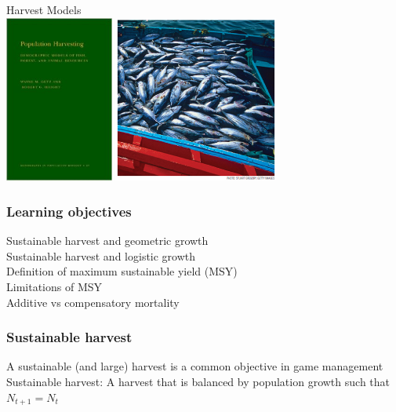 \documentclass[color=usenames,dvipsnames]{beamer}\usepackage[]{graphicx}\usepackage[]{xcolor}
\begin{document}
\begin{frame}[plain]
  \begin{center}
    {\huge Harvest Models} \\
    \vfill
    \includegraphics[height=5.5cm,keepaspectratio]{figs/book}
    \hspace{0.3cm}
    \includegraphics[height=5.5cm,keepaspectratio]{figs/tuna}
  \end{center}
\end{frame}


\begin{frame}
  \frametitle{Learning objectives}
  \large
  Sustainable harvest and geometric growth \\
  \vfill
  Sustainable harvest and logistic growth \\
  \vfill
  Definition of maximum sustainable yield (MSY) \\
  \vfill
  Limitations of MSY \\
  \vfill
  Additive vs compensatory mortality
\end{frame}





\begin{frame}
  \frametitle{Sustainable harvest}
  \large
  {%
    A sustainable (and large) harvest is a common
    objective in game management}
  \vfill
  \pause
  {%
    Sustainable harvest:}
  A harvest that is balanced by population growth such that
  $N_{t+1} = N_t$
\end{frame}
\end{document}

